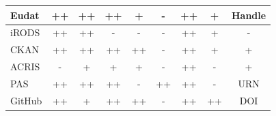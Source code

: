 \begin{table}
{\begin{tabular}{| l | c | c | c | c | c | c | c | c |}
            \hline
            \cellcolor{first-column-blue}Eudat       & \cellcolor{green}++ & \cellcolor{green}++ & \cellcolor{green}++ & \cellcolor{yellow}+  & \cellcolor{red}-  &  \cellcolor{green}++ & \cellcolor{yellow}+  & \cellcolor{green}Handle \\
            \hline
            \cellcolor{first-column-blue}iRODS       & \cellcolor{green}++ & \cellcolor{green}++ & \cellcolor{red}-  & \cellcolor{red}-  & \cellcolor{red}-  &  \cellcolor{green}++ & \cellcolor{yellow}+  & \cellcolor{red}- \\
            \hline
            \cellcolor{first-column-blue}CKAN        & \cellcolor{green}++ & \cellcolor{green}++ & \cellcolor{green}++ & \cellcolor{green}++ & \cellcolor{red}-  &  \cellcolor{green}++ & \cellcolor{yellow}+  & \cellcolor{yellow}+ \\
            \hline
            \cellcolor{first-column-blue}ACRIS       & \cellcolor{red}-  & \cellcolor{yellow}+  & \cellcolor{yellow}+  & \cellcolor{yellow}+  & \cellcolor{red}-  &  \cellcolor{green}++ & \cellcolor{red}-  & \cellcolor{yellow}+ \\
            \hline
            \cellcolor{first-column-blue}PAS         & \cellcolor{green}++ & \cellcolor{green}++ & \cellcolor{green}++ & \cellcolor{red}-  & \cellcolor{green}++ &  \cellcolor{green}++ & \cellcolor{red}-  & \cellcolor{green}URN \\
            \hline
            \cellcolor{first-column-blue}GitHub      & \cellcolor{green}++ & \cellcolor{yellow}+  & \cellcolor{green}++ & \cellcolor{green}++ & \cellcolor{red}-  &  \cellcolor{green}++ & \cellcolor{green}++ & \cellcolor{green}DOI \\
            \hline
        \end{tabular}
    }
\end{table}

